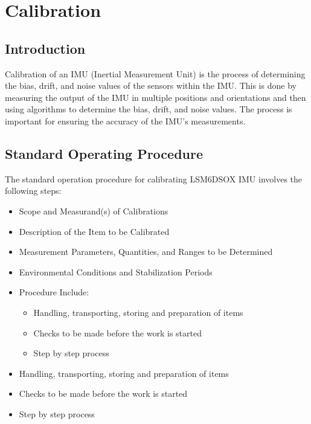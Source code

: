 %
%


\chapter{Calibration}  \label{Chap: Calibration}

\section{Introduction}

Calibration of an IMU (Inertial Measurement Unit) is the process of determining the bias, drift, and noise values of the sensors within the IMU. \cite{wahyudi:2011}This is done by measuring the output of the IMU in multiple positions and orientations and then using algorithms to determine the bias, drift, and noise values. The process is important for ensuring the accuracy of the IMU's measurements.\cite{Vectornav:2021}

\section{Standard Operating Procedure}
The standard operation procedure for calibrating LSM6DSOX IMU involves the following steps:

\begin{itemize}
    \item Scope and Measurand(s) of Calibrations 
    \item Description of the Item to be Calibrated
    \item Measurement Parameters, Quantities, and Ranges to be Determined 
    \item Environmental Conditions and Stabilization Periods 
    \item Procedure Include:
    \begin{itemize}
        \item Handling, transporting, storing and preparation of items
        \item Checks to be made before the work is started
        \item  Step by step process
    \end{itemize}
    \item Handling, transporting, storing and preparation of items
    \item Checks to be made before the work is started
    \item Step by step process 
\end{itemize}

